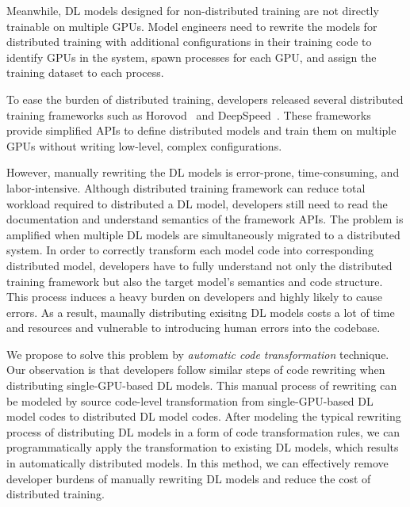 Meanwhile, DL models designed for non-distributed training are not directly
trainable on multiple GPUs.
Model engineers need to rewrite the models for distributed training
with additional configurations in their training code to identify GPUs in the
system, spawn processes for each GPU, and assign the training dataset to each
process.
\begin{inred}
To ease the burden of distributed training, developers released
several distributed training frameworks such as 
Horovod~\cite{sergeev2018horovod} and DeepSpeed~\cite{deepspeed}. 
These frameworks provide simplified APIs to define distributed models
and train them on multiple GPUs without writing low-level, complex configurations. 
\end{inred}

\begin{inred}
However, manually rewriting the DL models is error-prone, time-consuming, and labor-intensive.
Although distributed training framework can reduce total workload required to
distributed a DL model, developers still need to read the documentation and
understand semantics of the framework APIs. 
The problem is amplified when multiple DL models are simultaneously migrated to a distributed system.
In order to correctly transform each model code into corresponding distributed model,
developers have to fully understand not only the distributed training framework
but also the target model's semantics and code structure.
This process induces a heavy burden on developers and highly likely to cause errors.
As a result, maunally distributing exisitng DL models costs a lot of time and resources
and vulnerable to introducing human errors into the codebase.



We propose to solve this problem by \textit{automatic code transformation} technique.
Our observation is that developers follow similar steps of code rewriting
when distributing single-GPU-based DL models. 
This manual process of rewriting can be modeled by
source code-level transformation from single-GPU-based DL model codes
to distributed DL model codes.
After modeling the typical rewriting process of distributing DL models 
in a form of code transformation rules, 
we can programmatically apply the transformation to existing DL models,
which results in automatically distributed models.
In this method, we can effectively remove developer burdens of
manually rewriting DL models and reduce the cost of distributed training.
 
\end{inred}

